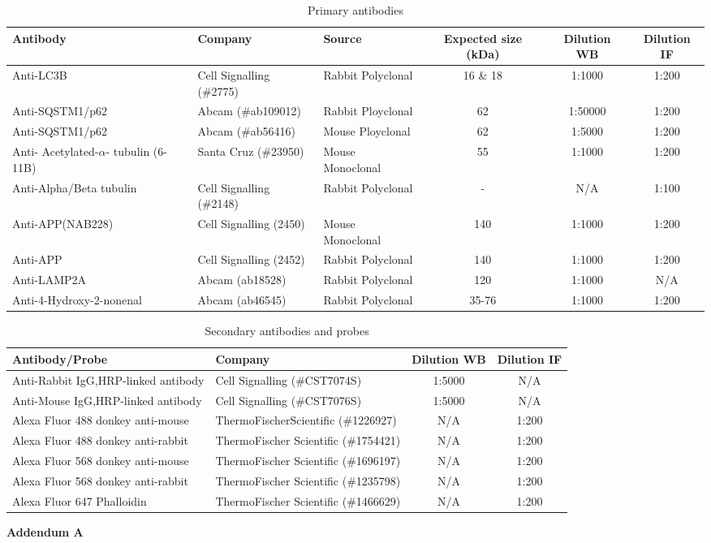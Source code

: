 \begin{landscape}
\begin{table}[p]
\centering
\caption[Primary antibodies]{Primary antibodies}
\label{tab:20_prim}
\begin{tabular}{lllccc}
\toprule
Antibody & Company & Source & Expected size (kDa) & Dilution WB & Dilution IF \\
\midrule
Anti-LC3B & Cell Signalling (\#2775) & Rabbit Polyclonal & 16 \& 18 & 1:1000 & 1:200 \\
Anti-SQSTM1/p62 & Abcam (\#ab109012) & Rabbit Ployclonal & 62 & 1:50000 & 1:200 \\
Anti-SQSTM1/p62 & Abcam (\#ab56416) & Mouse Ployclonal & 62 & 1:5000 & 1:200 \\
Anti- Acetylated-$\alpha$- tubulin (6-11B) & Santa Cruz (\#23950) & Mouse Monoclonal & 55 & 1:1000 & 1:200 \\
Anti-Alpha/Beta tubulin & Cell Signalling (\#2148) & Rabbit Polyclonal & - & N/A & 1:100 \\
Anti-APP(NAB228) & Cell Signalling (2450) & Mouse Monoclonal & 140 & 1:1000 & 1:200 \\
Anti-APP & Cell Signalling (2452) & Rabbit Polyclonal & 140 & 1:1000 & 1:200 \\
Anti-LAMP2A & Abcam (ab18528) & Rabbit Polyclonal & 120 & 1:1000 & N/A \\
Anti-4-Hydroxy-2-nonenal & Abcam (ab46545) & Rabbit Polyclonal & 35-76 & 1:1000 & 1:200 \\
\bottomrule
\end{tabular}
\end{table}
\begin{table}[p]
\centering
\caption[Secondary antibodies and probes]{Secondary antibodies and probes}
\label{tab:20_sec}
\begin{tabular}{llcc}
\toprule
Antibody/Probe & Company & Dilution WB & Dilution IF \\
\midrule
Anti-Rabbit IgG,HRP-linked antibody & Cell Signalling (\#CST7074S) & 1:5000 & N/A \\
Anti-Mouse IgG,HRP-linked antibody & Cell Signalling (\#CST7076S) & 1:5000 & N/A \\
Alexa Fluor 488 donkey anti-mouse & ThermoFischerScientific (\#1226927) & N/A & 1:200 \\
Alexa Fluor 488 donkey anti-rabbit & ThermoFischer Scientific (\#1754421) & N/A & 1:200 \\
Alexa Fluor 568 donkey anti-mouse & ThermoFischer Scientific (\#1696197) & N/A & 1:200 \\
Alexa Fluor 568 donkey anti-rabbit & ThermoFischer Scientific (\#1235798) & N/A & 1:200 \\
Alexa Fluor 647 Phalloidin & ThermoFischer Scientific (\#1466629) & N/A & 1:200 \\
\bottomrule
\end{tabular}
\end{table}
\end{landscape}\textbf{Addendum A}

